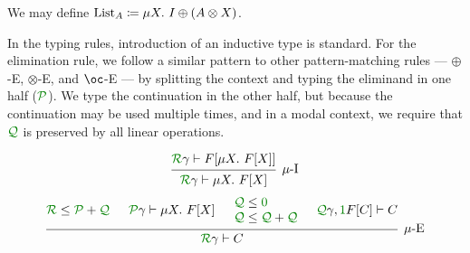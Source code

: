 \begin{example}
  We may define $\mathrm{List}_A \coloneqq \mu X.~I \oplus \plr{A \otimes X}$.
\end{example}

In the typing rules, introduction of an inductive type is standard.
For the elimination rule, we follow a similar pattern to other pattern-matching
rules --- $\oplus$-E, $\otimes$-E, and $\oc$-E --- by splitting the context
and typing the eliminand in one half ($\grP$).
We type the continuation in the other half, but because the continuation may
be used multiple times, and in a modal context, we require that $\grQ$ is
preserved by all linear operations.

\begin{displaymath}
  \begin{prooftree}
    \hypo{\grR\gamma \vdash F[\mu X.~F[X]]}
    \infer1[$\mu$-I]{\grR\gamma \vdash \mu X.~F[X]}
  \end{prooftree}
\end{displaymath}
\begin{displaymath}
  \begin{prooftree}
    \hypo{\grR \leq \grP + \grQ}
    \hypo{\grP\gamma \vdash \mu X.~F[X]}
    \hypo{%
      \begin{matrix*}[l]
        \grQ \leq \gr0 \\
        \grQ \leq \grQ + \grQ
      \end{matrix*}%
    }
    \hypo{\grQ\gamma, \gr1F[C] \vdash C}
    \infer4[$\mu$-E]{\grR\gamma \vdash C}
  \end{prooftree}
\end{displaymath}

